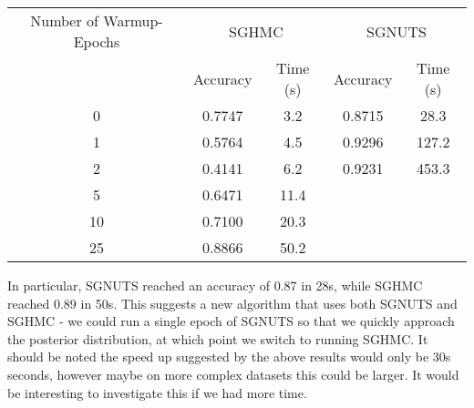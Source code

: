 \begin{center}
\begin{tabular}{ccccc} 
\hline
Number of Warmup-Epochs &\multicolumn{2}{c}{SGHMC}& \multicolumn{2}{c}{SGNUTS} \\
& Accuracy & Time (s) & Accuracy & Time (s) \\
 \hline
 0 &0.7747  &  3.2&0.8715&28.3\\ 
 1 & 0.5764 & 4.5 &0.9296&127.2\\ 
 2 & 0.4141 & 6.2&0.9231&453.3\\ 
 5 &0.6471& 11.4 &&\\ 
 10 &0.7100& 20.3 &&\\ 
 25 &0.8866& 50.2 &&\\ 
 \hline
\end{tabular}
\end{center}

In particular, SGNUTS reached an accuracy of 0.87 in 28s, while SGHMC reached 0.89 in 50s. This suggests a new algorithm that uses both SGNUTS and SGHMC - we could run a single epoch of SGNUTS so that we quickly approach the posterior distribution, at which point we switch to running SGHMC. It should be noted the speed up suggested by the above results would only be 30s seconds, however maybe on more complex datasets this could be larger. It would be interesting to investigate this if we had more time.
